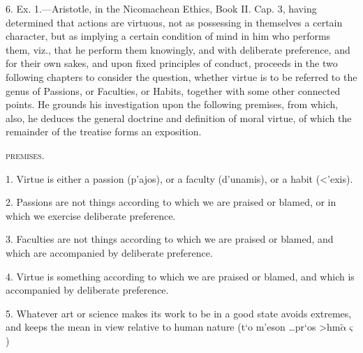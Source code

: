 \documentclass[oneside]{book}
\begin{document}
6. Ex. 1.---Aristotle, in the Nicomachean Ethics, Book II.
Cap. 3, having determined that actions are virtuous, not as possessing
in themselves a certain character, but as implying a certain
condition of mind in him who performs them, viz., that he
perform them knowingly, and with deliberate preference, and for
their own sakes, and upon fixed principles of conduct, proceeds
in the two following chapters to consider the question, whether
virtue is to be referred to the genus of Passions, or Faculties, or
Habits, together with some other connected points. He grounds
his investigation upon the following premises, from which, also,
he deduces the general doctrine and definition of moral virtue, of
which the remainder of the treatise forms an exposition.

\begin{center}
\textsc{premises}.
\end{center}

1. Virtue is either a passion (\textgreek{p'ajos}), or a faculty (\textgreek{d'unamis}),
or a habit (\textgreek{<'exis}).

2. Passions are not things according to which we are praised
or blamed, or in which we exercise deliberate preference.

3. Faculties are not things according to which we are praised
or blamed, and which are accompanied by deliberate preference.

4. Virtue is something according to which we are praised
or blamed, and which is accompanied by deliberate preference.

5. Whatever art or science makes its work to be in a good
state avoids extremes, and keeps the mean in view relative to
human nature (\textgreek{t`o m'eson \dots pr`os >hm}$\tilde{\alpha}\varsigma$)
\end{document}

